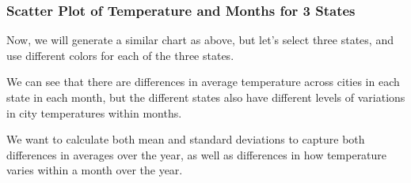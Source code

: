 \documentclass[
]{book}
\begin{document}
\hypertarget{scatter-plot-of-temperature-and-months-for-3-states}{%
\subsubsection{Scatter Plot of Temperature and Months for 3 States}\label{scatter-plot-of-temperature-and-months-for-3-states}}

Now, we will generate a similar chart as above, but let's select three states, and use different colors for each of the three states.

We can see that there are differences in average temperature across cities in each state in each month, but the different states also have different levels of variations in city temperatures within months.

We want to calculate both mean and standard deviations to capture both differences in averages over the year, as well as differences in how temperature varies within a month over the year.
\end{document}

